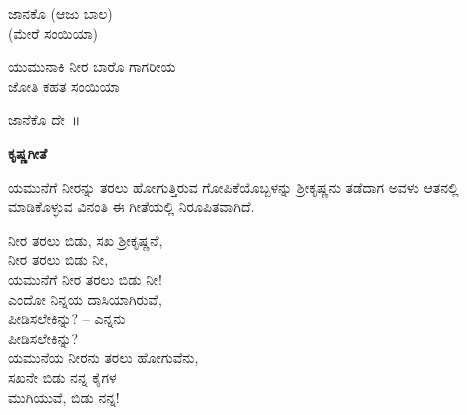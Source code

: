\begin{flushright}
ಜಾನಕೊ (ಆಜು ಬಾಲ)\\(ಮೇರೆ ಸಂಯಿಯಾ)
\end{flushright}

\begin{myquote}
ಯುಮುನಾಕಿ ನೀರ ಬಾರೊ ಗಾಗರೀಯ\\ಜೋತಿ ಕಹತ ಸಂಯಿಯಾ
\end{myquote}

\begin{flushright}
ಜಾನೆಕೊ ದೇ~॥
\end{flushright}

\begin{center}
\textbf{ಕೃಷ್ಣಗೀತೆ}
\end{center}

ಯಮುನೆಗೆ ನೀರನ್ನು ತರಲು ಹೋಗುತ್ತಿರುವ ಗೋಪಿಕೆಯೊಬ್ಬಳನ್ನು ಶ‍್ರೀಕೃಷ್ಣನು ತಡೆದಾಗ ಅವಳು ಆತನಲ್ಲಿ ಮಾಡಿಕೊಳ್ಳುವ ವಿನಂತಿ ಈ ಗೀತೆಯಲ್ಲಿ ನಿರೂಪಿತವಾಗಿದೆ.

\begin{myquote}
ನೀರ ತರಲು ಬಿಡು, ಸಖ ಶ‍್ರೀಕೃಷ್ಣನೆ,\\ನೀರ ತರಲು ಬಿಡು ನೀ,\\ಯಮುನೆಗೆ ನೀರ ತರಲು ಬಿಡು ನೀ!\\ಎಂದೋ ನಿನ್ನಯ ದಾಸಿಯಾಗಿರುವೆ,\\ಪೀಡಿಸಲೇಕಿನ್ನು? – ಎನ್ನನು\\ಪೀಡಿಸಲೇಕಿನ್ನು?\\ಯಮುನೆಯ ನೀರನು ತರಲು ಹೋಗುವೆನು,\\ಸಖನೇ ಬಿಡು ನನ್ನ ಕೈಗಳ\\ಮುಗಿಯುವೆ, ಬಿಡು ನನ್ನ!
\end{myquote}

